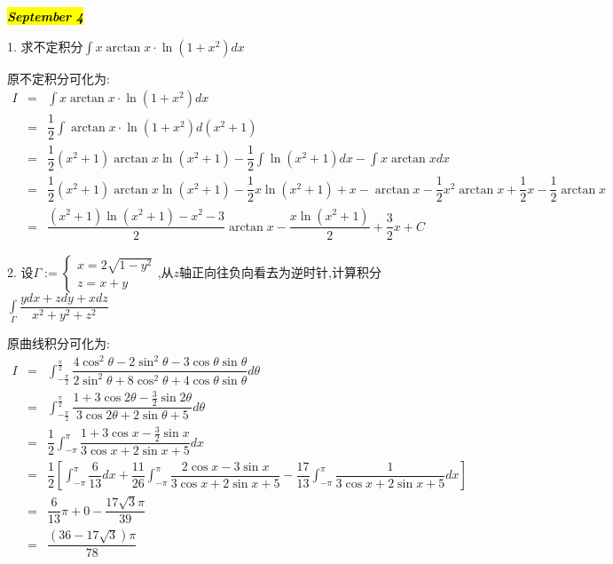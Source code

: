 \hl{\textbf{\textit{September 4}}}

1. 求不定积分$\int x\arctan x\cdot \ln(1+x^2)dx$
\begin{solution}

	原不定积分可化为:  
	\begin{eqnarray*}
		I&=&\int x\arctan x\cdot \ln(1+x^2)dx\\
		&=&\dfrac{1}{2}\int \arctan x\cdot \ln(1+x^2)d(x^2+1)\\
		&=&\dfrac{1}{2}(x^2+1)\arctan x\ln(x^2+1)-\dfrac{1}{2}\int \ln(x^2+1)dx-\int x\arctan xdx\\
		&=&\dfrac{1}{2}(x^2+1)\arctan x\ln(x^2+1)-\dfrac{1}{2}x\ln(x^2+1)+x-\arctan x-\dfrac{1}{2}x^2\arctan x+\dfrac{1}{2}x-\dfrac{1}{2}\arctan x\\
		&=&\dfrac{(x^2+1)\ln(x^2+1)-x^2-3}{2}\arctan x-\dfrac{x\ln(x^2+1)}{2}+\dfrac{3}{2}x+C
	\end{eqnarray*}
\end{solution}

2. 设$\varGamma:=\left\lbrace
\begin{array}{l}
	x=2\sqrt{1-y^2}\\
	z=x+y
\end{array}
\right. $,从$z$轴正向往负向看去为逆时针,计算积分$\int\limits_{\varGamma}\dfrac{ydx+zdy+xdz}{x^2+y^2+z^2}$
\begin{solution}

	原曲线积分可化为:  
	\begin{eqnarray*}
		I&=&\int_{-\frac{\pi}{2}}^{\frac{\pi}{2}}\dfrac{4\cos^2\theta-2\sin^2\theta-3\cos\theta\sin\theta}{2\sin^2\theta+8\cos^2\theta+4\cos\theta\sin\theta}d\theta\\
		&=&\int_{-\frac{\pi}{2}}^{\frac{\pi}{2}}\dfrac{1+3\cos 2\theta-\frac{3}{2}\sin 2\theta}{3\cos 2\theta+2\sin\theta+5}d\theta\\
		&=&\dfrac{1}{2}\int_{-\pi}^{\pi}\dfrac{1+3\cos x-\frac{3}{2}\sin x}{3\cos x+2\sin x+5}dx\\
		&=&\dfrac{1}{2}\left[ \int_{-\pi}^{\pi}\dfrac{6}{13}dx+\dfrac{11}{26}\int_{-\pi}^{\pi}\dfrac{2\cos x-3\sin x}{3\cos x+2\sin x+5}-\dfrac{17}{13}\int_{-\pi}^{\pi}\dfrac{1}{3\cos x+2\sin x+5}dx\right]\\
		&=&\dfrac{6}{13}\pi+0-\dfrac{17\sqrt{3}\pi}{39}\\
		&=&\dfrac{(36-17\sqrt{3})\pi}{78}
	\end{eqnarray*}
\end{solution}

